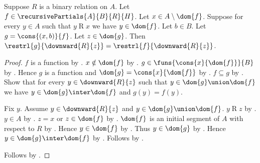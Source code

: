\begin{lemma}\label{recursive_extension_restriction}
    Suppose $R$ is a binary relation on $A$.
    Let $f\in\recursivePartials{A}{B}{R}{H}$.
    Let $x\in A\setminus\dom{f}$.
    Suppose for every $y\in A$ such that $y\mathrel{R}x$ we have $y\in\dom{f}$.
    Let $b\in B$.
    Let $g=\cons{(x,b)}{f}$.
    Let $z\in\dom{g}$.
    Then $\restrl{g}{\downward{R}{z}}=\restrl{f}{\downward{R}{z}}$.
\end{lemma}
\begin{proof}
    $f$ is a function by .
    $x\notin\dom{f}$ by .
    $g\in\funs{\cons{x}{\dom{f}}}{B}$
        by .
    Hence $g$ is a function and $\dom{g}=\cons{x}{\dom{f}}$
        by .
    $f\subseteq g$ by .
    Show that for every $y\in\downward{R}{z}$ such that
        $y\in\dom{g}\union\dom{f}$ we have
        $y\in\dom{g}\inter\dom{f}$ and $g(y)=f(y)$.
    \begin{subproof}
        Fix $y$.
        Assume $y\in\downward{R}{z}$ and $y\in\dom{g}\union\dom{f}$.
        $y\mathrel{R}z$ by .
        $y\in A$ by .
        $z=x$ or $z\in\dom{f}$ by .
        $\dom{f}$ is an initial segment of $A$ with respect to $R$
            by .
        Hence $y\in\dom{f}$ by .
        Thus $y\in\dom{g}$ by .
        Hence $y\in\dom{g}\inter\dom{f}$ by .
        Follows by .
    \end{subproof}
    Follows by .
\end{proof}

